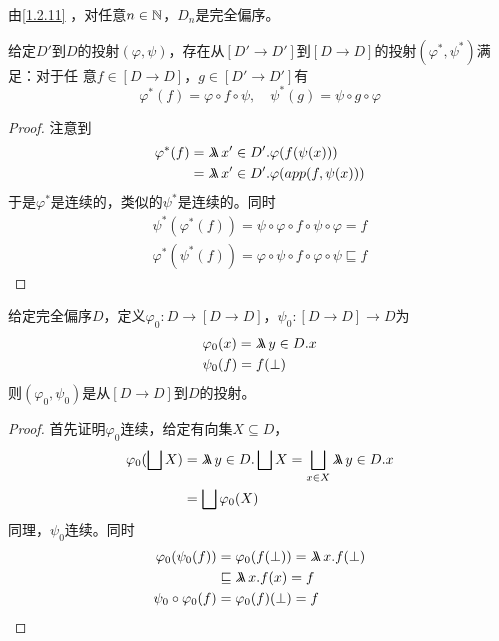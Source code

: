 \documentclass[11pt]{article}
\begin{document}
由\ref{1.2.11} ，对任意\(n\in\mathbb{N}\)，\(D_n\)是完全偏序。

\begin{lemma}[]
给定\(D'\)到\(D\)的投射\((\varphi,\psi)\)，存在从\([D'\to D']\)到\([D\to D]\)的投射\((\varphi^*,\psi^*)\)满足：对于任
意\(f\in[D\to D]\)，\(g\in[D'\to D']\)有
\begin{equation*}
\varphi^*(f)=\varphi\circ f\circ\psi,\quad\psi^*(g)=\psi\circ g\circ\varphi
\end{equation*}

\begin{center}\quad{}\end{center}
\end{lemma}

\begin{proof}
注意到
\begin{align*}
\varphi^*(f)&=\metalambda x'\in D'.\varphi(f(\psi(x)))\\
&=\metalambda x'\in D'.\varphi(app(f,\psi(x)))
\end{align*}
于是\(\varphi^*\)是连续的，类似的\(\psi^*\)是连续的。同时
\begin{gather*}
\psi^*(\varphi^*(f))=\psi\circ\varphi\circ f\circ\psi\circ\varphi=f\\
\varphi^*(\psi^*(f))=\varphi\circ\psi\circ f\circ\varphi\circ\psi\sqsubseteq f
\end{gather*}
\end{proof}

\begin{lemma}[]
给定完全偏序\(D\)，定义\(\varphi_0:D\to[D\to D]\)，\(\psi_0:[D\to D]\to D\)为
\begin{align*}
&\varphi_0(x)=\metalambda y\in D.x\\
&\psi_0(f)=f(\bot)
\end{align*}
则\((\varphi_0,\psi_0)\)是从\([D\to D]\)到\(D\)的投射。
\end{lemma}

\begin{proof}
首先证明\(\varphi_0\)连续，给定有向集\(X\subseteq D\)，
\begin{align*}
\varphi_0(\bigsqcup X)&=\metalambda y\in D.\bigsqcup X=\bigsqcup_{x\in X}\metalambda y\in D.x\\
&=\bigsqcup\varphi_0(X)
\end{align*}
同理，\(\psi_0\)连续。同时
\begin{align*}
\varphi_0(\psi_0(f))&=\varphi_0(f(\bot))=\metalambda x.f(\bot)\\
&\sqsubseteq\metalambda x.f(x)=f\\
\psi_0\circ\varphi_0(f)&=\varphi_0(f)(\bot)=f
\end{align*}
\end{proof}
\end{document}
